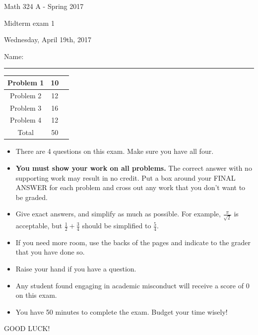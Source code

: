\documentclass[12 pt]{report}
\begin{document}
\noindent \vfill \noindent \large

\centerline{Math 324 A - Spring 2017}

\centerline{Midterm exam 1}

\centerline{Wednesday, April 19th, 2017}

\normalsize

\vfill
\medskip
Name: \rule{10cm}{1pt}

\bigskip

\vfill
\begin{center}
{\large
\begin{tabular}{||c|c|r||}
\hline Problem 1 & 10 & \hspace{10mm} \hfill \\
\hline Problem 2 & 12  & \hspace{10mm} \hfill \\
\hline Problem 3 & 16 & \hspace{10mm} \hfill \\
\hline Problem 4 & 12  & \hspace{10mm} \hfill \\
\hline Total & 50 & \hspace{10mm} \hfill \\
\hline
\end{tabular}
}
\end{center}
\vfill
\begin{itemize}
\item There are 4 questions on this exam. Make sure you have all four.
\item \textbf{You must show your work on all problems.}  The correct answer
with no supporting work may result in no credit. Put a box
around your FINAL ANSWER for each problem and cross out any work
that you don't want to be graded.
\item Give exact answers, and simplify as much as possible. 
For example, $\frac{\pi}{\sqrt{2}}$ is acceptable, but $\frac{1}{2} + \frac{3}{4}$
should be simplified to $\frac{5}{4}$.  

\item If you need more room, use the backs
of the pages and indicate to the grader that you have done so.
\item Raise your hand if you have a question.
\item Any student found engaging in academic misconduct will receive
a score of 0 on this exam.
\item You have 50 minutes to complete the exam.  Budget your time wisely! \\
\end{itemize}
\vfill
\begin{center}GOOD LUCK!\end{center}
\end{document}
